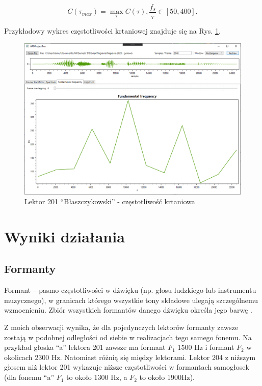 \documentclass[12pt,a4paper]{article}
\begin{document}
        \begin{equation*}
            C(\tau_{max})=\max_{\tau} C(\tau), \frac{f_s}{\tau} \in [50,400].
        \end{equation*}

        Przykładowy wykres częstotliwości krtaniowej znajduje się na Rys. \ref{fig:201_bla_f0}.

        \begin{figure}[h!]
            \centering
            \includegraphics[width=1.0\textwidth]{figures/201_bla_f0}
            \caption{Lektor 201 ``Błaszczykowski'' - częstotliwość krtaniowa}
            \label{fig:201_bla_f0}
        \end{figure}


\section{Wyniki działania\label{sec:prezentacja}}

    \subsection{Formanty}
        Formant – pasmo częstotliwości w dźwięku (np. głosu ludzkiego lub instrumentu muzycznego), w granicach którego wszystkie tony składowe ulegają szczególnemu wzmocnieniu. Zbiór wszystkich formantów danego dźwięku określa jego barwę \cite{drobner53}.

        Z moich obserwacji wynika, że dla pojedynczych lektorów formanty zawsze zostają w podobnej odległości od siebie w realizacjach tego samego fonemu. Na przykład głoska ``a'' lektora 201 zawsze ma formant $F_1$ 1500 Hz i formant $F_2$ w okolicach 2300 Hz. Natomiast różnią się między lektorami. Lektor 204 z niższym głosem niż lektor 201 wykazuje niższe częstotliwości w formantach samogłosek (dla fonemu ``a'' $F_1$ to około 1300 Hz, a $F_2$ to około 1900Hz).
\end{document}
